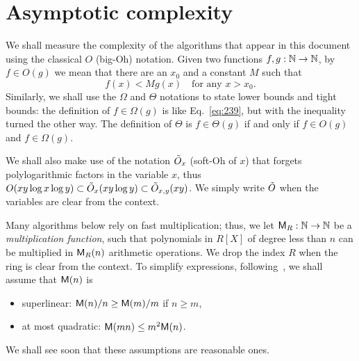 

\section{Asymptotic complexity}
\label{sec:asympt-compl}
 We shall measure the complexity of the
algorithms that appear in this document using the classical
 $O$ (big-Oh) notation. Given two functions
$f,g:\mathbb{N}\rightarrow\mathbb{N}$, by $f\in O(g)$ we mean that there are an $x_0$ and a
constant $M$ such that
\begin{equation}
  \label{eq:239}
  f(x)<Mg(x) \quad\text{for any $x>x_0$.}  
\end{equation}
Similarly, we shall use the
$\Omega$ and
$\Theta$ notations to state lower bounds and
tight bounds: the definition of $f\in\Omega(g)$ is like
Eq.~\eqref{eq:239}, but with the inequality turned the other way. The
definition of $\Theta$ is $f\in\Theta(g)$ if and only if $f\in O(g)$
and $f\in\Omega(g)$.

We shall also make use of the notation $\tilde{O}_x$
(soft-Oh of $x$) that forgets
polylogarithmic factors in the variable $x$, thus $O(xy\log x \log
y)\subset\tilde{O}_x(xy\log y)\subset\tilde{O}_{x,y}(xy)$. We simply write
$\tilde{O}$ when the variables are clear from the context.

Many algorithms below rely on fast multiplication; thus, we let
$\mathsf{M}_R : \mathbb{N} \rightarrow \mathbb{N}$ be a
\emph{multiplication
  function}, such
that polynomials in $R[X]$ of degree less than $n$ can be multiplied
in $\mathsf{M}_R(n)$ arithmetic operations. We drop the index $R$ when the
ring is clear from the context. To simplify expressions,
following~\cite[$\S$8.3]{vzGG}, we shall assume that $\mathsf{M}(n)$ is
\begin{itemize}
\item superlinear: $\mathsf{M}(n)/n \ge \mathsf{M}(m)/m$ if $n\ge m$,
\item at most quadratic: $\mathsf{M}(mn)\le m^2\mathsf{M}(n)$.
\end{itemize}
We shall see soon that these assumptions are reasonable ones.

